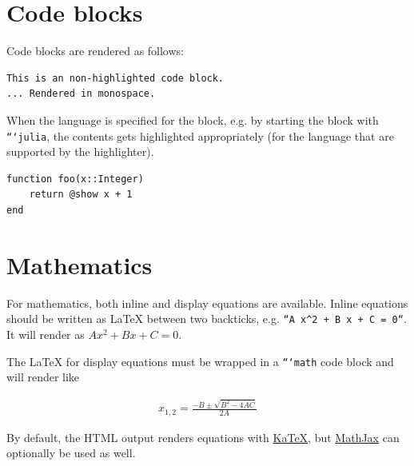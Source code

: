 \section{Code blocks}



\label{14660894509460337656}{}


Code blocks are rendered as follows:




\begin{verbatim}
This is an non-highlighted code block.
... Rendered in monospace.
\end{verbatim}



When the language is specified for the block, e.g. by starting the block with \texttt{```julia}, the contents gets highlighted appropriately (for the language that are supported by the highlighter).




\begin{verbatim}
function foo(x::Integer)
    return @show x + 1
end
\end{verbatim}



\section{Mathematics}



\label{9406902154236239312}{}


For mathematics, both inline and display equations are available. Inline equations should be written as LaTeX between two backticks, e.g. \texttt{``A x{\textasciicircum}2 + B x + C = 0``}. It will render as \(A x^2 + B x + C = 0\).



The LaTeX for display equations must be wrapped in a \texttt{```math} code block and will render like



\begin{equation*}
\begin{split}x_{1,2} = \frac{-B \pm \sqrt{B^2 - 4 A C}}{2A}\end{split}\end{equation*}


By default, the HTML output renders equations with \href{https://katex.org/}{KaTeX}, but \href{https://www.mathjax.org/}{MathJax} can optionally be used as well.



